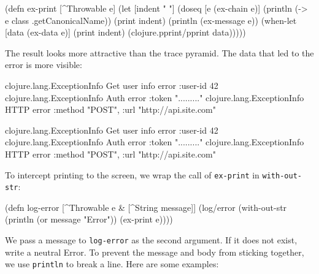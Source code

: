 \begin{english}
  \begin{clojure}
(defn ex-print
  [^Throwable e]
  (let [indent "  "]
    (doseq [e (ex-chain e)]
      (println (-> e class .getCanonicalName))
      (print indent)
      (println (ex-message e))
      (when-let [data (ex-data e)]
        (print indent)
        (clojure.pprint/pprint data)))))
  \end{clojure}
\end{english}

\fi

The result looks more attractive than the trace pyramid. The data that led to the error is more visible:

\ifx\DEVICETYPE\MOBILE

\begin{english}
  \begin{clojure}
clojure.lang.ExceptionInfo
  Get user info error
  {:user-id 42}
clojure.lang.ExceptionInfo
  Auth error
  {:token "........."}
clojure.lang.ExceptionInfo
  HTTP error
  {:method "POST",
   :url "http://api.site.com"}
  \end{clojure}
\end{english}

\else

\begin{english}
  \begin{clojure}
clojure.lang.ExceptionInfo
  Get user info error
  {:user-id 42}
clojure.lang.ExceptionInfo
  Auth error
  {:token "........."}
clojure.lang.ExceptionInfo
  HTTP error
  {:method "POST", :url "http://api.site.com"}
  \end{clojure}
\end{english}

\fi


To intercept printing to the screen, we wrap the call of \verb|ex-print| in \verb|with-out-str|:

\begin{english}
  \begin{clojure}
(defn log-error
  [^Throwable e & [^String message]]
  (log/error
   (with-out-str
     (println (or message "Error"))
     (ex-print e))))
  \end{clojure}
\end{english}

We pass a message to \verb|log-error| as the second argument. If it does not exist, write a neutral Error. To prevent the message and body from sticking together, we use \verb|println| to break a line. Here are some examples:


